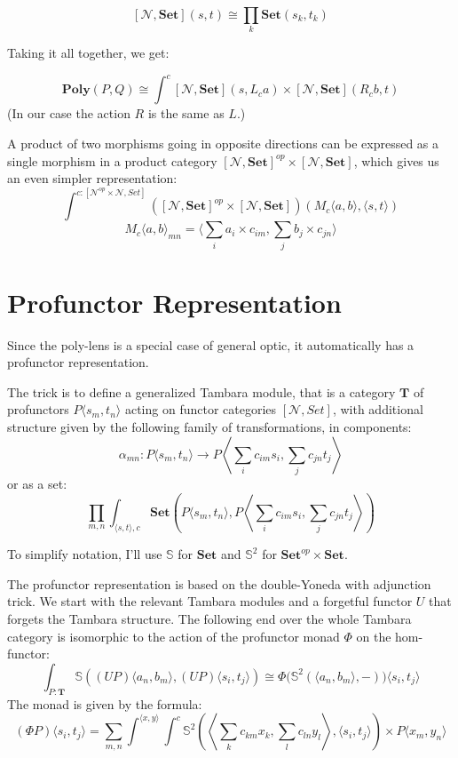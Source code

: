 \documentclass[11pt]{amsart}
\begin{document}
\[ [\mathcal{N}, \mathbf{Set}] (s, t) \cong \prod_k  \mathbf{Set} \left(s_k, t_k\right) \]

Taking it all together, we get:

\[ \mathbf{Poly}(P, Q) \cong \int^{c}   [\mathcal{N}, \mathbf{Set}]  \left(s, L_c a\right)  \times  [\mathcal{N}, \mathbf{Set}]  \left(R_c b, t\right) \]
(In our case the action $R$ is the same as $L$.)

A product of two morphisms going in opposite directions can be expressed as a single morphism in a product category $[\mathcal{N}, \mathbf{Set}]^{op}\times [\mathcal{N}, \mathbf{Set}] $, which gives us an even simpler representation:
\[ \int^{c \colon [\mathcal{N}^{op} \times \mathcal{N}, Set]} ([\mathcal{N}, \mathbf{Set}]^{op}\times [\mathcal{N}, \mathbf{Set}]) \left(M_c\langle   a, b \rangle, \langle s, t \rangle \right)\]
\[M_c \langle a, b\rangle_{m n} = \langle  \sum_i a_i \times  c_{ i m},  \sum_j  b_j \times c_{j n} \rangle \]
 
\section{Profunctor Representation}

Since the poly-lens is a special case of general optic, it automatically has a profunctor representation.

The trick is to define a generalized Tambara module, that is a category $\mathbf{T}$ of profunctors $P\langle s_m, t_n \rangle$ acting on functor categories $[\mathcal{N}, Set]$, with additional structure given by the following family of transformations, in components:
\[\alpha_{m n} \colon P\langle s_m, t_n \rangle \to P \left \langle \sum_i c_{i m}  s_i, \sum_j c_{j n} t_j \right \rangle \]
or as a set:
\[ \prod_{m, n} \int_{ \langle s, t \rangle, c} \mathbf{Set} \left(P\langle s_m, t_n \rangle, P \left \langle \sum_i c_{i m}  s_i, \sum_j c_{j n} t_j \right \rangle \right) \]

To simplify notation, I'll use $\mathbb{S}$ for $\mathbf{Set}$ and $\mathbb{S}^2$ for $\mathbf{Set}^{op} \times \mathbf{Set}$.

The profunctor representation is based on the double-Yoneda with adjunction trick. We start with the relevant Tambara modules and a forgetful functor $U$ that forgets the Tambara structure. The following end over the whole Tambara category is isomorphic to the action of the profunctor monad $\Phi$ on the hom-functor:
\[ \int_{P \colon \mathbf{T}} \mathbb{S}\left ( (U P)\langle a_n, b_m \rangle, (U P) \langle s_i, t_j \rangle \right) \cong \Phi \big( \mathbb{S}^2(\langle a_n, b_m \rangle, -) \big)  \langle s_i, t_j \rangle \]
The monad is given by the formula:
\[ (\Phi P) \langle s_i, t_j \rangle = \sum_{m, n} \int^{\langle x, y \rangle} \int^{c}  
    \mathbb{S}^2
      \left(\left \langle \sum_k c_{k m}  x_k
    , \sum_l c_{l n} y_l \right \rangle,  
        \langle s_i, t_j \rangle \right)
     \times  P\langle x_m, y_n \rangle\]
\end{document}
